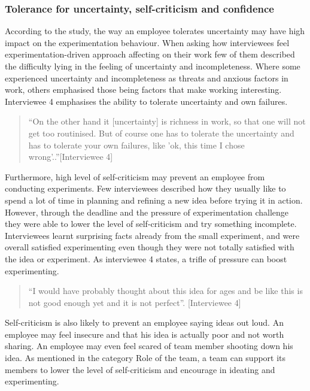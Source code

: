 \subsubsection{Tolerance for uncertainty, self-criticism and confidence}
According to the study, the way an employee tolerates uncertainty may have high impact on the experimentation behaviour. When asking how interviewees feel experimentation-driven approach affecting on their work few of them described the difficulty lying in the feeling of uncertainty and incompleteness. Where some experienced uncertainty and incompleteness as threats and anxious factors in work, others emphasised those being factors that make working interesting. Interviewee 4 emphasises the ability to tolerate uncertainty and own failures.
\begin{quote}
``On the other hand it [uncertainty] is richness in work, so that one will not get too routinised. But of course one has to tolerate the uncertainty and has to tolerate your own failures, like 'ok, this time I chose wrong'..''[Interviewee 4]
\end{quote}
Furthermore, high level of self-criticism may prevent an employee from conducting experiments. Few interviewees described how they usually like to spend a lot of time in planning and refining a new idea before trying it in action. However, through the deadline and the pressure of experimentation challenge they were able to lower the level of self-criticism and try something incomplete. Interviewees learnt surprising facts already from the small experiment, and were overall satisfied experimenting even though they were not totally satisfied with the idea or experiment. As interviewee 4 states, a trifle of pressure can boost experimenting.
\begin{quote}
``I would have probably thought about this idea for ages and be like this is not good enough yet and it is not perfect''. [Interviewee 4]
\end{quote}
Self-criticism is also likely to prevent an employee saying ideas out loud. An employee may feel insecure and that his idea is actually poor and not worth sharing. An employee may even feel scared of team member shooting down his idea. As mentioned in the category Role of the team, a team can support its members to lower the level of self-criticism and encourage in ideating and experimenting. 

